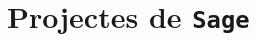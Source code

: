 \documentclass[11pt,fleqn]{book} %
\newcounter{let} \setcounter{let}{0}
\renewcommand{\1}{\mathbf{1}}
\newcommand{\0}{\mathbf{0}}
\begin{document}
\chapter{Projectes de \texttt{Sage}}
{
\let\subsection\section
\let\subsubsection\subsection
\let\paragraph\subsubsection

}

%
%
\end{document}

